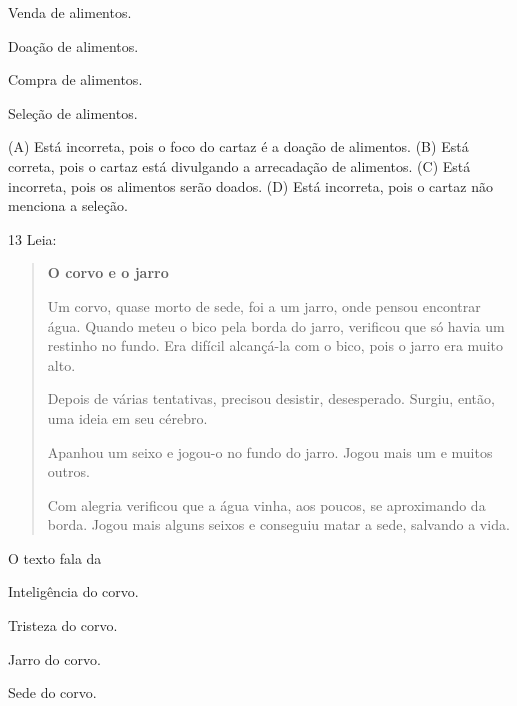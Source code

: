 \begin{escolha}
\item Venda de alimentos.

\item Doação de alimentos.

\item Compra de alimentos.

\item Seleção de alimentos.
\end{escolha}


(A) Está incorreta, pois o foco do cartaz é a doação de alimentos.
(B) Está correta, pois o cartaz está divulgando a arrecadação de alimentos.
(C) Está incorreta, pois os alimentos serão doados.
(D) Está incorreta, pois o cartaz não menciona a seleção.

\num{13} Leia:

\begin{quote}
\textbf{O corvo e o jarro}

Um corvo, quase morto de sede, foi a um jarro, onde pensou encontrar
água. Quando meteu o bico pela borda do jarro, verificou que só havia um
restinho no fundo. Era difícil alcançá-la com o bico, pois o jarro era
muito alto.

Depois de várias tentativas, precisou desistir, desesperado. Surgiu,
então, uma ideia em seu cérebro.

Apanhou um seixo e jogou-o no fundo do jarro. Jogou mais
um e muitos outros.

Com alegria verificou que a água vinha, aos poucos, se aproximando da
borda. Jogou mais alguns seixos e conseguiu matar a sede, salvando a
vida.
\end{quote}


O texto fala da

\begin{escolha}
\item Inteligência do corvo.

\item Tristeza do corvo.

\item Jarro do corvo.

\item Sede do corvo.
\end{escolha}

